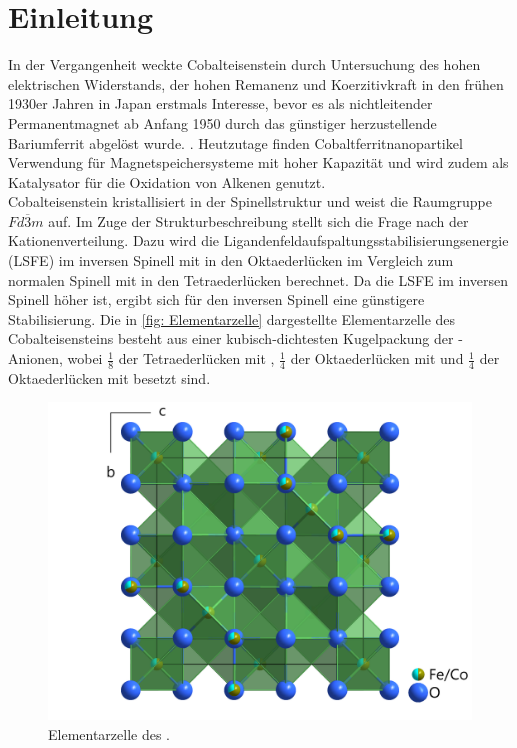 \documentclass[a4paper,12pt,bibliography=totocnumbered]{scrartcl}
\begin{document}
\clearpage

\renewcommand{\thepage}{\arabic{page}}
\setcounter{page}{1}


\section{Einleitung}
In der Vergangenheit weckte Cobalteisenstein durch Untersuchung des hohen elektrischen Widerstands, der hohen Remanenz und Koerzitivkraft in den frühen 1930er Jahren in Japan erstmals Interesse, bevor es als nichtleitender Permanentmagnet ab Anfang 1950 durch das günstiger herzustellende Bariumferrit abgelöst wurde.
\cite{History}.
Heutzutage finden Cobaltferritnanopartikel Verwendung für Magnetspeichersysteme mit hoher Kapazität und  wird zudem als Katalysator für die Oxidation von Alkenen genutzt.
\cite{Rieck} \\
Cobalteisenstein kristallisiert in der Spinellstruktur und weist die Raumgruppe $Fd \overline{3} m$ auf. 
Im Zuge der Strukturbeschreibung stellt sich die Frage nach der Kationenverteilung. 
Dazu wird die Ligandenfeldaufspaltungsstabilisierungsenergie (LSFE) im inversen Spinell mit  in den Oktaederlücken im Vergleich zum normalen Spinell mit  in den Tetraederlücken berechnet. 
Da die LSFE im inversen Spinell höher ist, ergibt sich für den inversen Spinell eine günstigere Stabilisierung.
Die in \autoref{fig: Elementarzelle} dargestellte Elementarzelle des Cobalteisensteins besteht aus einer kubisch-dichtesten Kugelpackung der -Anionen, wobei $\frac{1}{8}$ der Tetraederlücken mit , 
$\frac{1}{4}$ der Oktaederlücken mit  und $\frac{1}{4}$ der Oktaederlücken mit  besetzt sind. \\

\begin{figure}[H]
    \centering
    \includegraphics[scale=0.2]{Elementarzelle.png}
    \caption{Elementarzelle des .\cite{Rieck}}
    \label{fig: Elementarzelle}
\end{figure}
\end{document}
